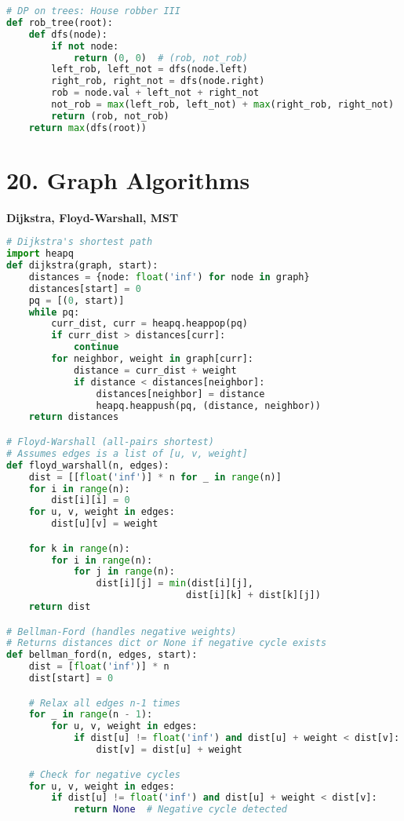 \documentclass[8pt,landscape]{article}
\begin{document}
\begin{multicols}{3}
\begin{lstlisting}[language=Python]
# DP on trees: House robber III
def rob_tree(root):
    def dfs(node):
        if not node:
            return (0, 0)  # (rob, not_rob)
        left_rob, left_not = dfs(node.left)
        right_rob, right_not = dfs(node.right)
        rob = node.val + left_not + right_not
        not_rob = max(left_rob, left_not) + max(right_rob, right_not)
        return (rob, not_rob)
    return max(dfs(root))
\end{lstlisting}

\section*{20. Graph Algorithms}
\textbf{Dijkstra, Floyd-Warshall, MST}
\begin{lstlisting}[language=Python]
# Dijkstra's shortest path
import heapq
def dijkstra(graph, start):
    distances = {node: float('inf') for node in graph}
    distances[start] = 0
    pq = [(0, start)]
    while pq:
        curr_dist, curr = heapq.heappop(pq)
        if curr_dist > distances[curr]:
            continue
        for neighbor, weight in graph[curr]:
            distance = curr_dist + weight
            if distance < distances[neighbor]:
                distances[neighbor] = distance
                heapq.heappush(pq, (distance, neighbor))
    return distances

# Floyd-Warshall (all-pairs shortest)
# Assumes edges is a list of [u, v, weight]
def floyd_warshall(n, edges):
    dist = [[float('inf')] * n for _ in range(n)]
    for i in range(n):
        dist[i][i] = 0
    for u, v, weight in edges:
        dist[u][v] = weight

    for k in range(n):
        for i in range(n):
            for j in range(n):
                dist[i][j] = min(dist[i][j],
                                dist[i][k] + dist[k][j])
    return dist

# Bellman-Ford (handles negative weights)
# Returns distances dict or None if negative cycle exists
def bellman_ford(n, edges, start):
    dist = [float('inf')] * n
    dist[start] = 0

    # Relax all edges n-1 times
    for _ in range(n - 1):
        for u, v, weight in edges:
            if dist[u] != float('inf') and dist[u] + weight < dist[v]:
                dist[v] = dist[u] + weight

    # Check for negative cycles
    for u, v, weight in edges:
        if dist[u] != float('inf') and dist[u] + weight < dist[v]:
            return None  # Negative cycle detected


\end{lstlisting}
\end{multicols}
\end{document}
